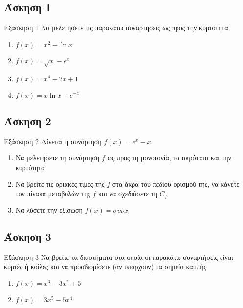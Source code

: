 \documentclass[greek]{beamer}
\begin{document}
\subsection{Άσκηση 1}
\begin{frame}[label=Άσκηση1,t]{Εξάσκηση 1}
 Να μελετήσετε τις παρακάτω συναρτήσεις ως προς την κυρτότητα
 \begin{enumerate}
  \item<1-> $f(x)=x^2-\ln x$
  \item<2-> $f(x)=\sqrt{x}-e^x$
  \item<3-> $f(x)=x^4-2x+1$
  \item<4-> $f(x)=x\ln x-e^{-x}$
 \end{enumerate}

\end{frame}

\subsection{Άσκηση 2}
\begin{frame}[label=Άσκηση2,t]{Εξάσκηση 2}
 Δίνεται η συνάρτηση $f(x)=e^x-x$.
 \begin{enumerate}
  \item<1-> Να μελετήσετε τη συνάρτηση $f$ ως προς τη μονοτονία, τα ακρότατα και την κυρτότητα
  \item<2-> Να βρείτε τις οριακές τιμές της $f$ στα άκρα του πεδίου ορισμού της, να κάνετε τον πίνακα μεταβολών της $f$ και να σχεδιάσετε τη $C_f$
  \item<3-> Να λύσετε την εξίσωση $f(x)=συνx$
 \end{enumerate}

\end{frame}

\subsection{Άσκηση 3}
\begin{frame}[label=Άσκηση3,t]{Εξάσκηση 3}
 Να βρείτε τα διαστήματα στα οποία οι παρακάτω συναρτήσεις είναι κυρτές ή κοίλες και να προσδιορίσετε (αν υπάρχουν) τα σημεία καμπής
 \begin{enumerate}
  \item<1-> $f(x)=x^3-3x^2+5$
  \item<2-> $f(x)=3x^5-5x^4$
 \end{enumerate}

\end{frame}
\end{document}
